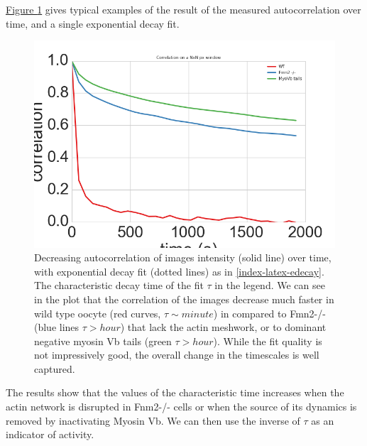 \documentclass[A4paperpaper,11pt,english]{sphinxmanual}
\begin{document}
\hyperref[index-latex:fig-exp-decay]{Figure  \ref*{index-latex:fig-exp-decay}} gives typical examples of the result of the
measured autocorrelation over time, and a single exponential decay fit.
\begin{figure}[htbp]
\centering
\capstart

\includegraphics[width=0.650\linewidth]{corrtime.png}
\caption{Decreasing autocorrelation of images intensity (solid line) over time, with
exponential decay fit (dotted lines) as in \eqref{index-latex-edecay}. The characteristic decay time of the fit
\(\tau\) in the legend. We can see in the plot that the
correlation of the images decrease much faster in wild type oocyte (red
curves, \(\tau \sim minute\)) in compared to Fmn2-/- (blue lines
\(\tau > hour\)) that lack the actin meshwork, or to dominant negative myosin Vb
tails (green \(\tau > hour\)). While the fit quality is not impressively good, the
overall change in the timescales is well captured.}\label{index-latex:fig-exp-decay}\end{figure}

The results show that the values of the characteristic time increases when
the actin network is disrupted in Fnm2-/- cells or when the source of its dynamics is removed by inactivating
Myosin Vb. We can then use the inverse of \(\tau\) as an indicator of
activity.
\end{document}
